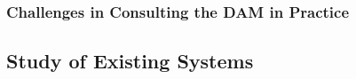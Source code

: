 \subsubsection{Challenges in Consulting the DAM in Practice}



\subsection{Study of Existing Systems}


